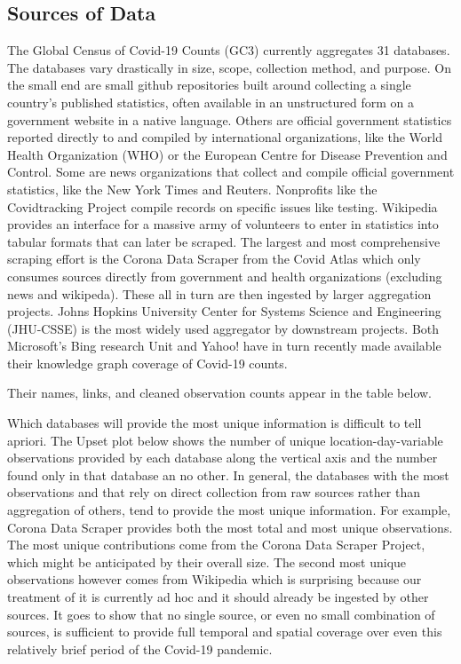 \documentclass[
]{book}
\begin{document}
\hypertarget{sources-of-data}{%
\subsection{Sources of Data}\label{sources-of-data}}

The Global Census of Covid-19 Counts (GC3) currently aggregates 31 databases. The databases vary drastically in size, scope, collection method, and purpose. On the small end are small github repositories built around collecting a single country's published statistics, often available in an unstructured form on a government website in a native language. Others are official government statistics reported directly to and compiled by international organizations, like the World Health Organization (WHO) or the European Centre for Disease Prevention and Control. Some are news organizations that collect and compile official government statistics, like the New York Times and Reuters. Nonprofits like the Covidtracking Project compile records on specific issues like testing. Wikipedia provides an interface for a massive army of volunteers to enter in statistics into tabular formats that can later be scraped. The largest and most comprehensive scraping effort is the Corona Data Scraper from the Covid Atlas which only consumes sources directly from government and health organizations (excluding news and wikipeda). These all in turn are then ingested by larger aggregation projects. Johns Hopkins University Center for Systems Science and Engineering (JHU-CSSE) is the most widely used aggregator by downstream projects. Both Microsoft's Bing research Unit and Yahoo! have in turn recently made available their knowledge graph coverage of Covid-19 counts.

Their names, links, and cleaned observation counts appear in the table below.

\hypertarget{htmlwidget-44d6081f7cc1222826b4}{}

Which databases will provide the most unique information is difficult to tell apriori. The Upset plot below shows the number of unique location-day-variable observations provided by each database along the vertical axis and the number found only in that database an no other. In general, the databases with the most observations and that rely on direct collection from raw sources rather than aggregation of others, tend to provide the most unique information. For example, Corona Data Scraper provides both the most total and most unique observations.
The most unique contributions come from the Corona Data Scraper Project, which might be anticipated by their overall size. The second most unique observations however comes from Wikipedia which is surprising because our treatment of it is currently ad hoc and it should already be ingested by other sources. It goes to show that no single source, or even no small combination of sources, is sufficient to provide full temporal and spatial coverage over even this relatively brief period of the Covid-19 pandemic.
\end{document}
